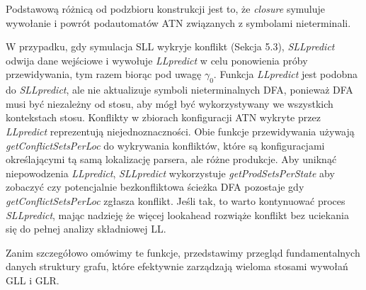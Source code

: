 Podstawową różnicą od podzbioru konstrukcji jest to, że \textit{closure} symuluje wywołanie
i powrót podautomatów ATN związanych z symbolami nieterminali.
\par
W przypadku, gdy symulacja SLL wykryje konflikt (Sekcja 5.3), \textit{SLLpredict} odwija dane wejściowe
i wywołuje \textit{LLpredict} w celu ponowienia próby przewidywania, tym razem biorąc pod uwagę $\gamma_0$.
Funkcja \textit{LLpredict} jest podobna do \textit{SLLpredict}, ale nie aktualizuje symboli nieterminalnych
DFA, ponieważ DFA musi być niezależny od stosu, aby mógł być wykorzystywany we wszystkich kontekstach stosu.
Konflikty w zbiorach konfiguracji ATN wykryte przez \textit{LLpredict} reprezentują niejednoznaczności.
Obie funkcje przewidywania używają \textit{getConflictSetsPerLoc} do wykrywania konfliktów,
które są konfiguracjami określającymi tą samą lokalizację parsera, ale różne produkcje.
Aby uniknąć niepowodzenia \textit{LLpredict}, \textit{SLLpredict} wykorzystuje \textit{getProdSetsPerState}
aby zobaczyć czy potencjalnie bezkonfliktowa ścieżka DFA pozostaje gdy \textit{getConflictSetsPerLoc}
zgłasza konflikt.
Jeśli tak, to warto kontynuować proces \textit{SLLpredict}, mając nadzieję że więcej lookahead
rozwiąże konflikt bez uciekania się do pełnej analizy składniowej LL.
\par
Zanim szczegółowo omówimy te funkcje, przedstawimy przegląd fundamentalnych danych struktury grafu,
które efektywnie zarządzają wieloma stosami wywołań GLL i GLR.
